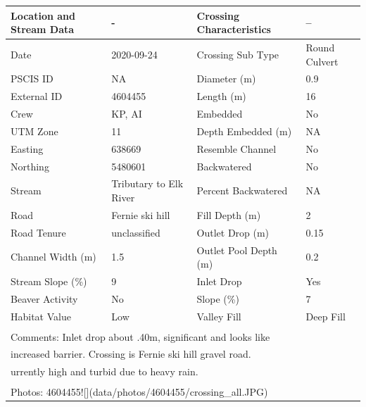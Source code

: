 \documentclass[
]{book}
\begin{document}
\begin{tabular}{llll}
\toprule
Location and Stream Data & - & Crossing Characteristics & --\\
\midrule
Date & 2020-09-24 & Crossing Sub Type & Round Culvert\\
PSCIS ID & NA & Diameter (m) & 0.9\\
External ID & 4604455 & Length (m) & 16\\
Crew & KP, AI & Embedded & No\\
UTM Zone & 11 & Depth Embedded (m) & NA\\
\addlinespace
Easting & 638669 & Resemble Channel & No\\
Northing & 5480601 & Backwatered & No\\
Stream & Tributary to Elk River & Percent Backwatered & NA\\
Road & Fernie ski hill & Fill Depth (m) & 2\\
Road Tenure & unclassified & Outlet Drop (m) & 0.15\\
\addlinespace
Channel Width (m) & 1.5 & Outlet Pool Depth (m) & 0.2\\
Stream Slope (\%) & 9 & Inlet Drop & Yes\\
Beaver Activity & No & Slope (\%) & 7\\
Habitat Value & Low & Valley Fill & Deep Fill\\
\bottomrule
\multicolumn{4}{l}{\textsuperscript{} Comments: Inlet drop about .40m, significant and looks like}\\
\multicolumn{4}{l}{increased barrier. Crossing is Fernie ski hill gravel road.}\\
\multicolumn{4}{l}{urrently high and turbid due to heavy rain.}\\
\multicolumn{4}{l}{\textsuperscript{} Photos: 4604455![](data/photos/4604455/crossing\_all.JPG)}\\
\end{tabular}
\end{document}
